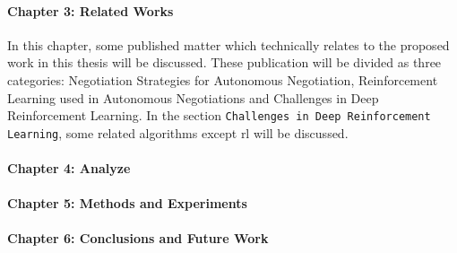 \paragraph{Chapter 3: Related Works}
In this chapter, some published matter which technically relates to the proposed work in this thesis will be discussed. These publication will be divided as three categories: Negotiation Strategies for Autonomous Negotiation, Reinforcement Learning used in Autonomous Negotiations and Challenges in Deep Reinforcement Learning. In the section \texttt{Challenges in Deep Reinforcement Learning}, some related algorithms except \gls{rl} will be discussed.

\paragraph{Chapter 4: Analyze}
\paragraph{Chapter 5: Methods and Experiments}
\paragraph{Chapter 6: Conclusions and Future Work}